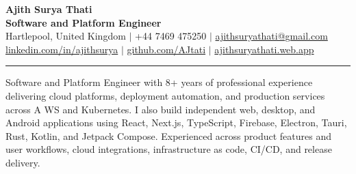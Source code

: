 \documentclass[letterpaper,10pt]{article}
\newcommand{\cvSection}[1]{\vspace{8pt}\noindent{\large\bfseries #1}\par\vspace{2pt}\hrule\vspace{4pt}}
\begin{document}
\begin{center}
{\LARGE\bfseries Ajith Surya Thati}\\[2pt]
{\large\bfseries Software and Platform Engineer}\\[4pt]
\small Hartlepool, United Kingdom $|$ +44 7469 475250 $|$ \href{mailto:ajithsuryathati@gmail.com}{ajithsuryathati@gmail.com}\\[2pt]
\small \href{https://linkedin.com/in/ajithsurya}{linkedin.com/in/ajithsurya} $|$ \href{https://github.com/AJtati}{github.com/AJtati} $|$ \href{https://ajithsuryathati.web.app}{ajithsuryathati.web.app}
\end{center}
\vspace{-7pt}
\small

\cvSection{Summary}
Software and Platform Engineer with 8+ years of professional experience delivering cloud platforms, deployment automation, and production services across A\kern0pt WS and Kubernetes. I also build independent web, desktop, and Android applications using React, Next.js, TypeScript, Firebase, Electron, Tauri, Rust, Kotlin, and Jetpack Compose. Experienced across product features and user workf{}lows, cloud integrations, infrastructure as code, CI/CD, and release delivery.
\end{document}
